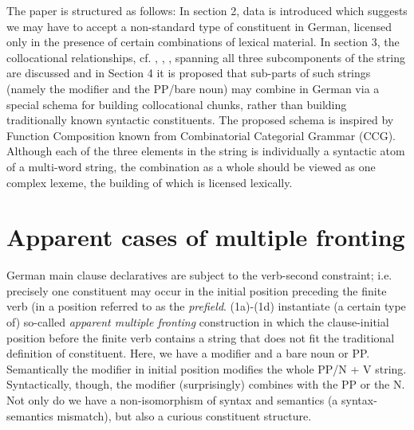 \documentclass[11pt,a4paper,fleqn]{article}
\begin{document}
The paper is structured as follows: In section 2, data is introduced which suggests we may have to accept a non-standard type of constituent in German, licensed
 only in the presence of certain combinations of lexical material. In section 3, the collocational relationships, cf. \citet{Firth1957},
\citet{Sinclair1991, Sinclair1996}, \citet{Evert2008}, spanning all three subcomponents of the string are discussed and in Section 4 
it is proposed that sub-parts of such strings (namely the modifier and the PP/bare noun) 
may combine in German via a special schema for building collocational chunks, rather than building
traditionally known syntactic constituents. The proposed schema is inspired by Function Composition known from
Combinatorial Categorial Grammar (CCG). Although each of the three elements in the string is individually a syntactic atom of a multi-word string, the combination as a whole
should be viewed as one complex lexeme, the building of which is licensed lexically.


\section{Apparent cases of multiple fronting}
      
German main clause declaratives are subject to the verb-second constraint; i.e. precisely one constituent may occur in the initial position preceding the finite verb (in a position referred to as the \textit{prefield}.
(1a)-(1d) instantiate (a certain type of) so-called \textit{apparent multiple fronting} construction in which the clause-initial position before the
finite verb contains a string that does not fit the traditional definition of constituent. Here, we have a modifier and a bare noun or PP.
Semantically the modifier in initial position modifies the whole PP/N + V string.
Syntactically, though,  the modifier (surprisingly) combines with the
PP or the N.  Not only do we have a non-isomorphism of syntax and semantics (a syntax-semantics mismatch), but also a curious
constituent structure.
 
\end{document}
